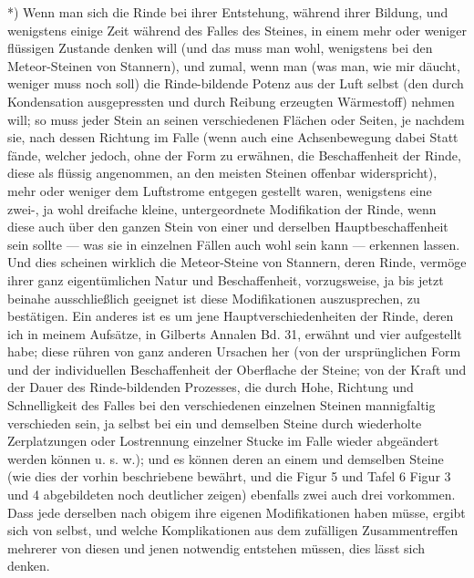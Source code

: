 \documentclass[a4paper, 11pt, oneside, german]{article}
\begin{document}
*) Wenn man sich die Rinde bei ihrer Entstehung, während ihrer Bildung, und wenigstens einige Zeit während des Falles des Steines, in einem mehr oder weniger flüssigen Zustande denken will (und das muss man wohl, wenigstens bei den Meteor-Steinen von Stannern), und zumal, wenn man (was man, wie mir däucht, weniger muss noch soll) die Rinde-bildende Potenz aus der Luft selbst (den durch Kondensation ausgepressten und durch Reibung erzeugten Wärmestoff) nehmen will; so muss jeder Stein an seinen verschiedenen Flächen oder Seiten, je nachdem sie, nach dessen Richtung im Falle (wenn auch eine Achsenbewegung dabei Statt fände, welcher jedoch, ohne der Form zu erwähnen, die Beschaffenheit der Rinde, diese als flüssig angenommen, an den meisten Steinen offenbar widerspricht), mehr oder weniger dem Luftstrome entgegen gestellt waren, wenigstens eine zwei-, ja wohl dreifache kleine, untergeordnete Modifikation der Rinde, wenn diese auch über den ganzen Stein von einer und derselben Hauptbeschaffenheit sein sollte --- was sie in einzelnen Fällen auch wohl sein kann --- erkennen lassen. Und dies scheinen wirklich die Meteor-Steine von Stannern, deren Rinde, vermöge ihrer ganz eigentümlichen Natur und Beschaffenheit, vorzugsweise, ja bis jetzt beinahe ausschließlich geeignet ist diese Modifikationen auszusprechen, zu bestätigen. Ein anderes ist es um jene Hauptverschiedenheiten der Rinde, deren ich in meinem Aufsätze, in Gilberts Annalen Bd. 31, erwähnt und vier aufgestellt habe; diese rühren von ganz anderen Ursachen her (von der ursprünglichen Form und der individuellen Beschaffenheit der Oberflache der Steine; von der Kraft und der Dauer des Rinde-bildenden Prozesses, die durch Hohe, Richtung und Schnelligkeit des Falles bei den verschiedenen einzelnen Steinen mannigfaltig verschieden sein, ja selbst bei ein und demselben Steine durch wiederholte Zerplatzungen oder Lostrennung einzelner Stucke im Falle wieder abgeändert werden können u. s. w.); und es können deren an einem und demselben Steine (wie dies der vorhin beschriebene bewährt, und die Figur 5 und Tafel 6 Figur 3 und 4 abgebildeten noch deutlicher zeigen) ebenfalls zwei auch drei vorkommen. Dass jede derselben nach obigem ihre eigenen Modifikationen haben müsse, ergibt sich von selbst, und welche Komplikationen aus dem zufälligen Zusammentreffen mehrerer von diesen und jenen notwendig entstehen müssen, dies lässt sich denken.
\end{document}
